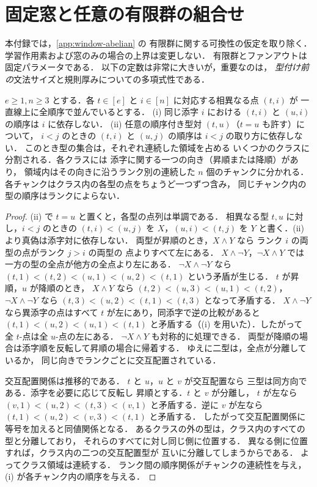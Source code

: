 \section{固定窓と任意の有限群の組合せ}
\label{app:window-group}

本付録では，\ref{app:window-abelian} の
有限群に関する可換性の仮定を取り除く．
学習作用素および窓のみの場合の上界は変更しない．
有限群とファンアウトは固定パラメータである．
以下の定数は非常に大きいが，重要なのは，
\emph{型付け前の}文法サイズと規則厚みについての多項式性である．

\begin{lemma}[均質なブロック配置の構造]
\label{lem:group-block-order}
$e\ge1,n\ge3$ とする．各 $t\in[e]$ と
$i\in[n]$ に対応する相異なる点 $(t,i)$ が
一直線上に全順序で並んでいるとする．
(i) 同じ添字 $i$ における $(t,i)$ と $(u,i)$ の順序は
$i$ に依存しない．
(ii) 任意の順序付き型対 $(t,u)$（$t=u$ も許す）について，
$i<j$ のときの $(t,i)$ と $(u,j)$ の順序は
$i<j$ の取り方に依存しない．
このとき型の集合は，それぞれ連続した領域を占める
いくつかのクラスに分割される．各クラスには
添字に関する一つの向き（昇順または降順）があり，
領域内はその向きに沿うランク別の連続した
$n$ 個のチャンクに分かれる．
各チャンクはクラス内の各型の点をちょうど一つずつ含み，
同じチャンク内の型の順序はランクによらない．
\end{lemma}
\begin{proof}
(ii) で $t=u$ と置くと，各型の点列は単調である．
相異なる型 $t,u$ に対し，$i<j$ のときの
$(t,i)<(u,j)$ を $X$，$(u,i)<(t,j)$ を $Y$
と書く．(ii) より真偽は添字対に依存しない．
両型が昇順のとき，$X\land Y$ なら
ランク $i$ の両型の点がランク $j>i$ の両型の
点よりすべて左にある．
$X\land\neg Y$，$\neg X\land Y$ では
一方の型の全点が他方の全点より左にある．
$\neg X\land\neg Y$ なら
\((t,1)<(t,2)<(u,1)<(u,2)<(t,1)\)
という矛盾が生じる．
$t$ が昇順，$u$ が降順のとき，
$X\land Y$ なら
$(t,2)<(u,3)<(u,1)<(t,2)$，
$\neg X\land\neg Y$ なら
$(t,3)<(u,2)<(t,1)<(t,3)$
となって矛盾する．
$X\land\neg Y$ なら異添字の点はすべて
$t$ が左にあり，同添字で逆の比較があると
$(t,1)<(u,2)<(u,1)<(t,1)$
と矛盾する（(i) を用いた）．したがって
全 $t$-点は全 $u$-点の左にある．
$\neg X\land Y$ も対称的に処理できる．
両型が降順の場合は添字順を反転して昇順の場合に帰着する．
ゆえに二型は，全点が分離しているか，
同じ向きでランクごとに交互配置されている．

交互配置関係は推移的である．
$t$ と $u$，$u$ と $v$ が交互配置なら
三型は同方向である．添字を必要に応じて反転し
昇順とする．$t$ と $v$ が分離し，
$t$ が左なら
\((v,1)<(u,2)<(t,3)<(v,1)\)
と矛盾する．逆に $v$ が左なら
$(t,1)<(u,2)<(v,3)<(t,1)$
と矛盾する．
したがって交互配置関係に等号を加えると同値関係となる．
あるクラスの外の型は，クラス内のすべての型と分離しており，
それらのすべてに対し同じ側に位置する．
異なる側に位置すれば，クラス内の二つの交互配置型が
互いに分離してしまうからである．
よってクラス領域は連続する．
ランク間の順序関係がチャンクの連続性を与え，
(i) が各チャンク内の順序を与える．
\end{proof}

